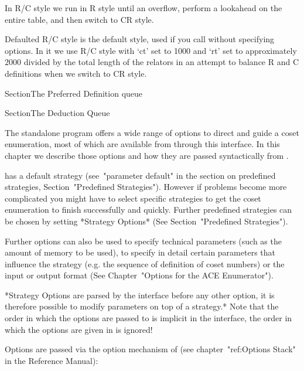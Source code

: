 In R/C style we run in  R style until an overflow, perform a lookahead
on the entire table, and then switch to CR style.

Defaulted  R/C style is  the default  style, used  if you  call {\ACE}
without specifying  options. In it we  use R/C style with  `ct' set to
1000 and `rt' set to  approximately $2000$ divided by the total length
of the relators  in an attempt to balance R and  C definitions when we
switch to CR style.


Section{The Preferred Definition queue}


Section{The Deduction Queue}


The {\ACE} standalone program offers a wide range of options to direct
and guide a coset enumeration, most of which are available from {\GAP}
through this interface.  In this chapter we describe those options and
how they are passed syntactically from {\GAP}.

{\ACE} has a default  strategy (see~"parameter default" in the section
on predefined strategies, Section~"Predefined Strategies"). However if
problems  become more complicated  you might  have to  select specific
strategies  to get the  coset enumeration  to finish  successfully and
quickly.   Further  predefined strategies  can  be  chosen by  setting
*Strategy Options*  (See Section~"Predefined Strategies").

Further options can also be used to specify technical parameters (such
as the  amount of  memory to  be used), to  specify in  detail certain
parameters  that  influence  the   strategy  (e.g.   the  sequence  of
definition  of coset  numbers)  or  the input  or  output format  (See
Chapter~"Options for the ACE Enumerator").

*Strategy Options are parsed by  the {\GAP} interface before any other
option,  it is therefore  possible to  modify parameters  on top  of a
strategy.*  Note that the  order in  which the  options are  passed to
{\ACE} is  implicit in the interface,  the order in  which the options
are given in {\GAP} is ignored!


Options  are   passed  via  the   option  mechanism  of   {\GAP}  (see
chapter~"ref:Options Stack"  in the Reference Manual):  

